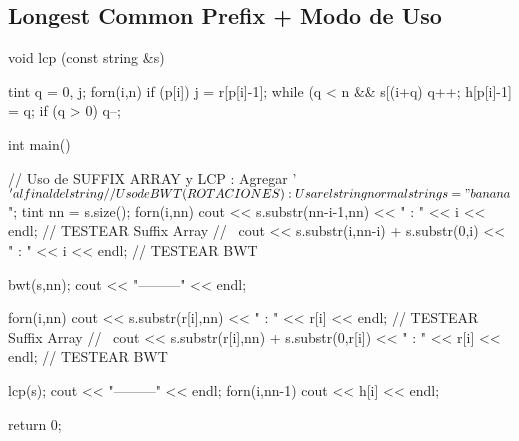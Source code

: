 \subsection{Longest Common Prefix + Modo de Uso}

\begin{code}
void lcp (const string &s)
{
	tint q = 0, j;
	forn(i,n)
	{
		if (p[i])
		{
			j = r[p[i]-1];
			while (q < n && s[(i+q)%
			q++;
			h[p[i]-1] = q;
			if (q > 0)
			q--;
		}
	}
	
}

int main()
{
	// Uso de SUFFIX ARRAY y LCP : Agregar '$' al final del string
	// Uso de BWT (ROTACIONES) : Usar el string normal
	
	string s = "banana$";
	tint nn = s.size();
	forn(i,nn)
		cout << s.substr(nn-i-1,nn) << " : " << i << endl; // TESTEAR Suffix Array
		//~ cout << s.substr(i,nn-i) + s.substr(0,i) << " : " << i << endl; // TESTEAR BWT
	
	bwt(s,nn);
	cout << "---------" << endl;
	
	
	forn(i,nn)
		cout << s.substr(r[i],nn) << " : " << r[i] << endl; // TESTEAR Suffix Array
		//~ cout << s.substr(r[i],nn) + s.substr(0,r[i]) << " : " << r[i] << endl; // TESTEAR BWT
	
	lcp(s);
	cout << "---------" << endl;
	forn(i,nn-1)
		cout << h[i] << endl;
	
	
	return 0;
}

\end{code}
